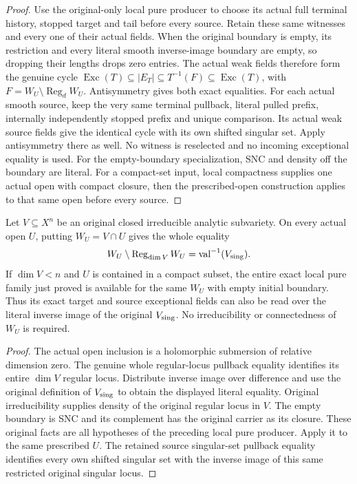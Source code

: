 \begin{proof}
Use the original-only local pure producer to choose its actual full terminal
history, stopped target and tail before every source. Retain these same
witnesses and every one of their actual fields. When the original boundary is
empty, its restriction and every literal smooth inverse-image boundary are
empty, so dropping their lengths drops zero entries. The actual weak fields
therefore form the genuine cycle
$\operatorname{Exc}(T)\subseteq|E_T|\subseteq T^{-1}(F)
\subseteq\operatorname{Exc}(T)$, with
$F=W_U\setminus\operatorname{Reg}_dW_U$. Antisymmetry gives both exact
equalities. For each actual smooth source, keep the very same terminal
pullback, literal pulled prefix, internally independently stopped prefix and
unique comparison. Its actual weak source fields give the identical cycle
with its own shifted singular set. Apply antisymmetry there as well. No
witness is reselected and no incoming exceptional equality is used.
For the empty-boundary specialization, SNC and density off the boundary
are literal. For a compact-set input, local compactness supplies one
actual open with compact closure, then the prescribed-open construction
applies to that same open before every source.
\end{proof}

\begin{lemma}
\label{hir:original-local-irreducible-own-singular-locus}
\leanok
Let $V\subseteq X^n$ be an original closed irreducible analytic subvariety.
On every actual open $U$, putting $W_U=V\cap U$ gives the whole equality
\[
 W_U\setminus\operatorname{Reg}_{\dim V}W_U
   =\operatorname{val}^{-1}(V_{\rm sing}).
\]
If $\dim V<n$ and $U$ is contained in a compact subset, the entire exact
local pure family just proved is available for the same $W_U$ with empty
initial boundary. Thus its exact target and source exceptional fields can
also be read over the literal inverse image of the original $V_{\rm sing}$.
No irreducibility or connectedness of $W_U$ is required.
\end{lemma}
\begin{proof}
The actual open inclusion is a holomorphic submersion of relative dimension
zero. The genuine whole regular-locus pullback equality identifies its
entire $\dim V$ regular locus. Distribute inverse image over difference and
use the original definition of $V_{\rm sing}$ to obtain the displayed
literal equality. Original irreducibility supplies density of the original
regular locus in $V$. The empty boundary is SNC and its complement has the
original carrier as its closure. These original facts are all hypotheses of
the preceding local pure producer. Apply it to the same prescribed $U$.
The retained source singular-set pullback equality identifies every own
shifted singular set with the inverse image of this same restricted
original singular locus.
\end{proof}

